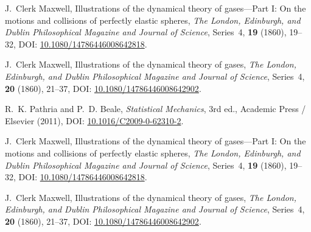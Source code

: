            J.~Clerk Maxwell,
            \newblock Illustrations of the dynamical theory of gases---Part I: On the motions and collisions of perfectly elastic spheres,
            \newblock \emph{The London, Edinburgh, and Dublin Philosophical Magazine and Journal of Science}, Series~4, \textbf{19} (1860), 19--32,
            \newblock DOI: \href{https://doi.org/10.1080/14786446008642818}{10.1080/14786446008642818}.

            J.~Clerk Maxwell,
            \newblock Illustrations of the dynamical theory of gases,
            \newblock \emph{The London, Edinburgh, and Dublin Philosophical Magazine and Journal of Science}, Series~4, \textbf{20} (1860), 21--37,
            \newblock DOI: \href{https://doi.org/10.1080/14786446008642902}{10.1080/14786446008642902}.

            R.~K. Pathria and P.~D. Beale,
            \newblock \emph{Statistical Mechanics}, 3rd ed.,
            \newblock Academic Press / Elsevier (2011),
            \newblock DOI: \href{https://doi.org/10.1016/C2009-0-62310-2}{10.1016/C2009-0-62310-2}.



J.~Clerk Maxwell,
\newblock Illustrations of the dynamical theory of gases---Part I: On the motions and collisions of perfectly elastic spheres,
\newblock \emph{The London, Edinburgh, and Dublin Philosophical Magazine and Journal of Science}, Series~4, \textbf{19} (1860), 19--32,
\newblock DOI: \href{https://doi.org/10.1080/14786446008642818}{10.1080/14786446008642818}.

J.~Clerk Maxwell,
\newblock Illustrations of the dynamical theory of gases,
\newblock \emph{The London, Edinburgh, and Dublin Philosophical Magazine and Journal of Science}, Series~4, \textbf{20} (1860), 21--37,
\newblock DOI: \href{https://doi.org/10.1080/14786446008642902}{10.1080/14786446008642902}.

